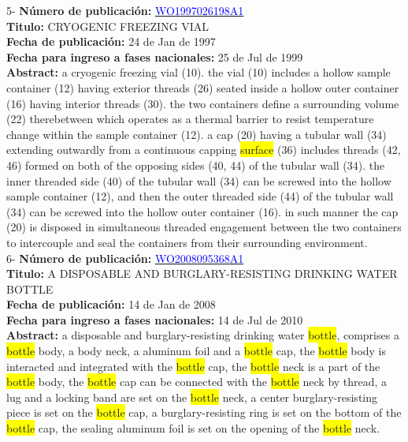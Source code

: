 \vspace{1cm}5- \textbf{Número de publicación:} \href{https://worldwide.espacenet.com/publicationDetails/biblio?DB=EPODOC&II=0&ND=3&adjacent=true&locale=en_EP&FT=D&date=20160331&CC=WO&NR=1997026198A1&KC=A1#}{\textcolor{blue}{WO1997026198A1}}\\ 
\textbf{Titulo:} CRYOGENIC FREEZING VIAL\\ 
 
\textbf{Fecha de publicación:} 24 de Jan de 1997\\ 
\textbf{Fecha para ingreso a fases nacionales:} 25 de Jul de 1999\\ 
\textbf{Abstract:} a cryogenic freezing vial (10). the vial (10) includes a hollow sample container (12) having exterior threads (26) seated inside a hollow outer container (16) having interior threads (30). the two containers define a surrounding volume (22) therebetween which operates as a thermal barrier to resist temperature change within the sample container (12). a cap (20) having a tubular wall (34) extending outwardly from a continuous capping \colorbox{yellow}{surface} (36) includes threads (42, 46) formed on both of the opposing sides (40, 44) of the tubular wall (34). the inner threaded side (40) of the tubular wall (34) can be screwed into the hollow sample container (12), and then the outer threaded side (44) of the tubular wall (34) can be screwed into the hollow outer container (16). in such manner the cap (20) is disposed in simultaneous threaded engagement between the two containers to intercouple and seal the containers from their surrounding environment.\\ 
 

 \vspace{1cm}6- \textbf{Número de publicación:} \href{https://worldwide.espacenet.com/publicationDetails/biblio?DB=EPODOC&II=0&ND=3&adjacent=true&locale=en_EP&FT=D&date=20160331&CC=WO&NR=2008095368A1&KC=A1#}{\textcolor{blue}{WO2008095368A1}}\\ 
\textbf{Titulo:} A DISPOSABLE AND BURGLARY-RESISTING DRINKING WATER BOTTLE\\ 
 
\textbf{Fecha de publicación:} 14 de Jan de 2008\\ 
\textbf{Fecha para ingreso a fases nacionales:} 14 de Jul de 2010\\ 
\textbf{Abstract:} a disposable and burglary-resisting drinking water \colorbox{yellow}{bottle}, comprises a \colorbox{yellow}{bottle} body, a body neck, a aluminum foil and a \colorbox{yellow}{bottle} cap, the \colorbox{yellow}{bottle} body is interacted and integrated with the \colorbox{yellow}{bottle} cap, the \colorbox{yellow}{bottle} neck is a part of the \colorbox{yellow}{bottle} body, the \colorbox{yellow}{bottle} cap can be connected with the \colorbox{yellow}{bottle} neck by thread, a lug and a locking band are set on the \colorbox{yellow}{bottle} neck, a center burglary-resisting piece is set on the \colorbox{yellow}{bottle} cap, a burglary-resisting ring is set on the bottom of the \colorbox{yellow}{bottle} cap, the sealing aluminum foil is set on the opening of the \colorbox{yellow}{bottle} neck.\\ 
 

